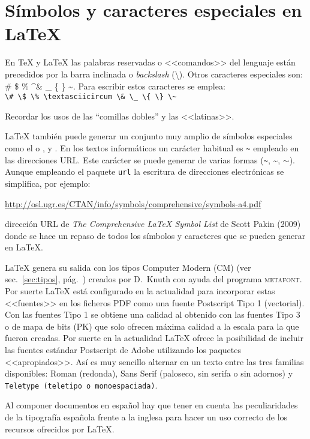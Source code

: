 \documentclass[11pt,a4paper]{article}
\begin{document}
\section[Símbolos]{Símbolos y caracteres especiales en \LaTeX{}}
\label{sec:simb} %

En \TeX{} y \LaTeX{} las palabras reservadas o <<comandos>> del lenguaje están precedidos por la barra inclinada o \emph{backslash} (\textbackslash). Otros caracteres especiales son: \# \$ \% \textasciicircum \& \_ \{ \} \~{}. Para escribir estos caracteres se emplea:\\
\verb!\# \$ \% \textasciicircum \& \_ \{ \} \~!

Recordar los usos de las ``comillas dobles'' y las <<latinas>>.

\LaTeX{} también puede generar un conjunto muy amplio de símbolos especiales como el \EUR{} o \texteuro,  y \Coffeecup. En los textos informáticos un carácter habitual es \verb+~+ empleado en las direcciones URL. Este carácter se puede generar de varias formas (\verb+~+, \~{}, $\sim$). Aunque empleando el paquete \texttt{url} la escritura de direcciones electrónicas se simplifica, por ejemplo:

{\url{http://osl.ugr.es/CTAN/info/symbols/comprehensive/symbols-a4.pdf}}

\noindent dirección URL de \emph{The Comprehensive \LaTeX{} Symbol List} de Scott Pakin (2009) donde se hace un repaso de todos los símbolos y caracteres que se pueden generar en \LaTeX{}.

\LaTeX{} genera su salida con los tipos Computer Modern (CM) (ver sec.~\ref{sec:tipos}, pág.~\pageref{sec:tipos}) creados por D.~Knuth con ayuda del programa \textsc{metafont}. Por suerte \LaTeX{} está configurado en la actualidad para incorporar estas <<fuentes>> en los ficheros PDF como una fuente Postscript Tipo 1 (vectorial). Con las fuentes Tipo 1 se obtiene una calidad al obtenido con las fuentes Tipo 3 o de mapa de bits (PK) que solo ofrecen máxima calidad a la escala para la que fueron creadas. Por suerte en la actualidad \LaTeX{} ofrece la posibilidad de incluir las fuentes estándar Postscript de Adobe utilizando los paquetes <<apropiados>>. Así es muy sencillo alternar en un texto entre las tres familias disponibles: Roman (redonda), \textsf{Sans Serif (paloseco, sin serifa o sin adornos)} y \texttt{Teletype (teletipo o monoespaciada)}. 

Al componer documentos en español hay que tener en cuenta las peculiaridades de la tipografía española frente a la inglesa para hacer un uso correcto de los recursos ofrecidos por \LaTeX.
\end{document}
